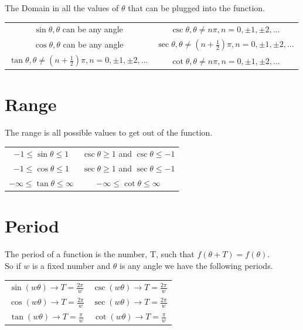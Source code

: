 \documentclass[10pt,onecolumn]{article}
\begin{document}
{The Domain in all the values of \(\theta\) that can be plugged into the function. \\
\begin{tabular}{c|c}
\(\sin \theta, \theta\)  can be any angle & \(\csc \theta, \theta \neq n\pi, n = 0, \pm 1, \pm 2, ... \)\\
\(\cos \theta, \theta\)  can be any angle & \(\sec \theta, \theta \neq (n + \frac{1}{2})\pi, n = 0, \pm 1, \pm 2, ... \) \\
\(\tan \theta, \theta \neq (n + \frac{1}{2})\pi, n = 0, \pm 1, \pm 2, ...\) & \(\cot \theta, \theta \neq n\pi, n = 0, \pm 1, \pm 2, ... \) \\
\end{tabular}
\section{Range}

The range is all possible values to get out of the function. \\

\begin{tabular}{c|c}
\(-1 \le \sin \theta \le 1\) & \(\csc \theta \ge 1\) and \(\csc \theta \le -1\) \\
\(-1 \le \cos \theta \le 1\) & \(\sec \theta \ge 1\) and \(\sec \theta \le -1\) \\
\(-\infty \le \tan\theta \le \infty\) & \(-\infty \le \cot \theta \le \infty\) \\
\end{tabular}

\section{Period}

The period of a function is the number, T, such that \(f(\theta + T) = f(\theta) \). \\ 
So if \(w\) is a fixed number and \(\theta\) is any angle we have the following periods.

\begin{tabular}{c|c}
\(\sin(w\theta) \rightarrow T = \frac{2\pi}{w} \) & \(\csc(w\theta) \rightarrow T = \frac{2\pi}{w} \) \\
\(\cos(w\theta) \rightarrow T = \frac{2\pi}{w} \) & \(\sec(w\theta) \rightarrow T = \frac{2\pi}{w} \) \\
\(\tan(w\theta) \rightarrow T = \frac{\pi}{w} \) & \(\cot(w\theta) \rightarrow T = \frac{\pi}{w} \)\\
\end{tabular}
\pagebreak

}
\end{document}
